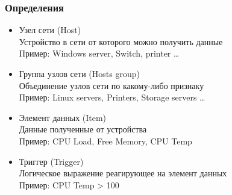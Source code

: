 \begin{frame}[fragile]
    \frametitle{Определения}
        \begin{itemize}
            \item \alert{Узел сети (Host)} \\
            Устройство в сети от которого можно получить данные \\
            Пример: Windows server, Switch, printer …
            \item \alert{Группа узлов сети (Hosts group)} \\
            Объединение узлов сети по какому-либо признаку \\
            Пример: Linux servers, Printers, Storage servers …
            \item \alert{Элемент данных (Item)} \\
            Данные полученные от устройства \\
            Пример: CPU Load, Free Memory, CPU Temp
            \item \alert{Триггер (Trigger)} \\
            Логическое выражение реагирующее на элемент данных \\
            Пример: CPU Temp > 100
        \end{itemize}
\end{frame}


